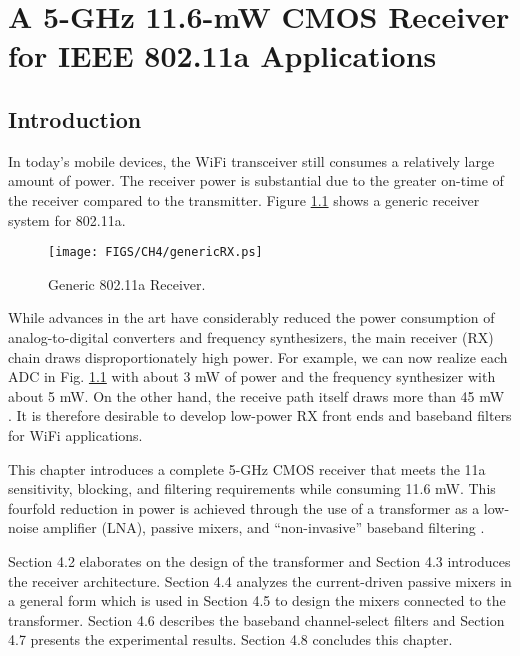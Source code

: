 \chapter{A 5-GHz 11.6-mW CMOS Receiver for IEEE 802.11a Applications}                        




\section{Introduction}

In today's mobile devices, the WiFi transceiver still consumes a relatively large amount of power. 
The receiver power is substantial due to the greater on-time of the receiver compared to the transmitter.
Figure \ref{fig:genericRX} shows a generic receiver system for 802.11a. 
\begin{figure}[htb!]
\centering
\texttt{[image: FIGS/CH4/genericRX.ps]}
\caption{Generic 802.11a Receiver.}
\label{fig:genericRX}
\end{figure}
While advances in the art have considerably reduced the power consumption of analog-to-digital converters and frequency synthesizers, the main
receiver (RX) chain draws disproportionately high power. For example, we can now realize each ADC in Fig. \ref{fig:genericRX} with about 3 mW of power and
the frequency synthesizer with about 5 mW. On the other hand, the receive path itself draws more than 45 mW \cite{Kan}. It is therefore desirable to
develop low-power RX front ends and baseband filters for WiFi applications. 

This chapter introduces a complete 5-GHz CMOS receiver that meets the 11a sensitivity, blocking, and filtering requirements while consuming 11.6 mW.
This fourfold reduction in power is achieved through the use of a transformer as a low-noise amplifier (LNA), passive mixers, and ``non-invasive''
baseband filtering \cite{Zolfaghari}.

Section 4.2 elaborates on the design of the transformer and Section 4.3 introduces the receiver architecture.
Section 4.4 analyzes the current-driven passive mixers in a general form which is used in Section 4.5 to design the mixers connected to the transformer. 
Section 4.6 describes the baseband channel-select filters and Section 4.7 presents the experimental results. Section 4.8 concludes this chapter.


 
